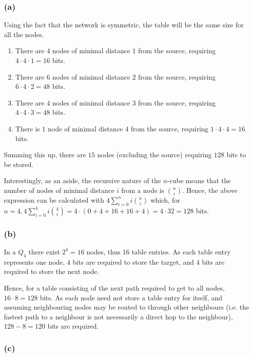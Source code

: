 \subsubsection*{(a)}

Using the fact that the network is symmetric, the table will be the same size for all the nodes.

\begin{enumerate}
    \item There are $4$ nodes of minimal distance $1$ from the source, requiring $4 \cdot 4 \cdot 1 = 16$ bits.
    \item There are $6$ nodes of minimal distance $2$ from the source, requiring $6 \cdot 4 \cdot 2 = 48$ bits.
    \item There are $4$ nodes of minimal distance $3$ from the source, requiring $4 \cdot 4 \cdot 3 = 48$ bits.
    \item There is $1$ node of minimal distance $4$ from the source, requiring $1 \cdot 4 \cdot 4 = 16$ bits.
\end{enumerate}

Summing this up, there are $15$ nodes (excluding the source) requiring $128$ bits to be stored.

Interestingly, as an aside, the recursive nature of the $n$-cube means that the number of nodes of minimal distance $i$ from a node is $\binom{n}{i}$.
Hence, the above expression can be calculated with $4 \sum_{i = 0}^{n}{i \binom{n}{i}}$ which, for $n = 4, 4 \sum_{i = 0}^{4}{i \binom{4}{i}} = 4 \cdot (0 + 4 + 16 + 16 + 4) = 4 \cdot 32 = 128$ bits.

\subsubsection*{(b)}

In a $Q_4$ there exist $2^4 = 16$ nodes, thus $16$ table entries.
As each table entry represents one node, $4$ bits are required to store the target, and $4$ bits are required to store the next node.

Hence, for a table consisting of the next path required to get to all nodes, $16 \cdot 8 = 128$ bits.
As each node need not store a table entry for itself, and assuming neighbouring nodes may be routed to through other neighbours (i.e. the fastest path to a neighbour is not necessarily a direct hop to the neighbour), $128 - 8 = 120$ bits are required.

\subsubsection*{(c)}




